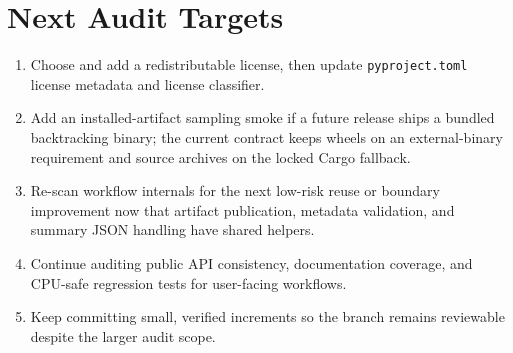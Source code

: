 \documentclass[11pt]{article}
\begin{document}
\section{Next Audit Targets}

\begin{enumerate}[leftmargin=*]
  \item Choose and add a redistributable license, then update
        \texttt{pyproject.toml} license metadata and license classifier.
  \item Add an installed-artifact sampling smoke if a future release ships a
        bundled backtracking binary; the current contract keeps wheels on an
        external-binary requirement and source archives on the locked Cargo
        fallback.
  \item Re-scan workflow internals for the next low-risk reuse or boundary
        improvement now that artifact publication, metadata validation, and
        summary JSON handling have shared helpers.
  \item Continue auditing public API consistency, documentation coverage, and
        CPU-safe regression tests for user-facing workflows.
  \item Keep committing small, verified increments so the branch remains
        reviewable despite the larger audit scope.
\end{enumerate}
\end{document}
